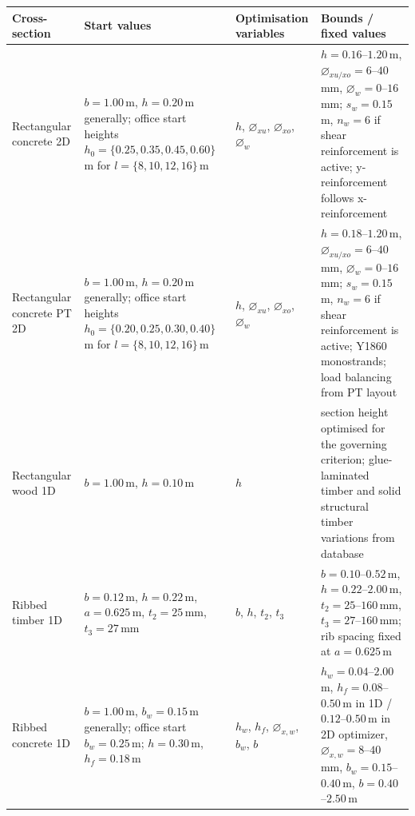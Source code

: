 \begin{table}[t]
    \centering
    \begingroup
    \scriptsize
    \setlength{\tabcolsep}{3pt}
    \renewcommand{\arraystretch}{1.15}
    \begin{tabularx}{\textwidth}{@{}l|X|X|X@{}}
    \hline
    \textbf{Cross-section} &
    \textbf{Start values} &
    \textbf{Optimisation variables} &
    \textbf{Bounds / fixed values} \\ \hline

    Rectangular concrete 2D &
    $b=1.00$\,m, $h=0.20$\,m generally; office start heights $h_0=\{0.25,0.35,0.45,0.60\}$\,m for $l=\{8,10,12,16\}$\,m &
    $h$, $\varnothing_{xu}$, $\varnothing_{xo}$, $\varnothing_w$ &
    $h=0.16$--$1.20$\,m, $\varnothing_{xu/xo}=6$--$40$\,mm, $\varnothing_w=0$--$16$\,mm; $s_w=0.15$\,m, $n_w=6$ if shear reinforcement is active; y-reinforcement follows x-reinforcement \\

    Rectangular concrete PT 2D &
    $b=1.00$\,m, $h=0.20$\,m generally; office start heights $h_0=\{0.20,0.25,0.30,0.40\}$\,m for $l=\{8,10,12,16\}$\,m &
    $h$, $\varnothing_{xu}$, $\varnothing_{xo}$, $\varnothing_w$ &
    $h=0.18$--$1.20$\,m, $\varnothing_{xu/xo}=6$--$40$\,mm, $\varnothing_w=0$--$16$\,mm; $s_w=0.15$\,m, $n_w=6$ if shear reinforcement is active; Y1860 monostrands; load balancing from PT layout \\

    Rectangular wood 1D &
    $b=1.00$\,m, $h=0.10$\,m &
    $h$ &
    section height optimised for the governing criterion; glue-laminated timber and solid structural timber variations from database \\

    Ribbed timber 1D &
    $b=0.12$\,m, $h=0.22$\,m, $a=0.625$\,m, $t_2=25$\,mm, $t_3=27$\,mm &
    $b$, $h$, $t_2$, $t_3$ &
    $b=0.10$--$0.52$\,m, $h=0.22$--$2.00$\,m, $t_2=25$--$160$\,mm, $t_3=27$--$160$\,mm; rib spacing fixed at $a=0.625$\,m \\

    Ribbed concrete 1D &
    $b=1.00$\,m, $b_w=0.15$\,m generally; office start $b_w=0.25$\,m; $h=0.30$\,m, $h_f=0.18$\,m &
    $h_w$, $h_f$, $\varnothing_{x,w}$, $b_w$, $b$ &
    $h_w=0.04$--$2.00$\,m, $h_f=0.08$--$0.50$\,m in 1D / $0.12$--$0.50$\,m in 2D optimizer, $\varnothing_{x,w}=8$--$40$\,mm, $b_w=0.15$--$0.40$\,m, $b=0.40$--$2.50$\,m \\


\end{tabularx}
\end{table}
